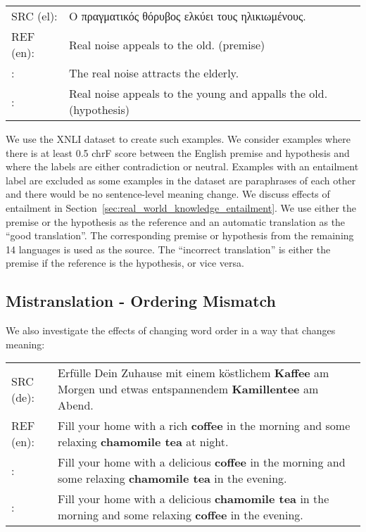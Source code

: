 \documentclass[11pt]{article}
\newcommand{\cmark}{\textcolor{darkpastelgreen}{\ding{51}}}\newcommand{\xmark}{\textcolor{darkpastelred}{\ding{55}}}
\begin{document}
\begin{small}
\vspace{0.5cm}
\setlength{\extrarowheight}{0.1cm}
\begin{tabularx}{0.95\columnwidth}{lX}
     SRC (el): &  \foreignlanguage{greek}{Ο πραγματικός θόρυβος ελκύει τους ηλικιωμένους}.\\
     REF (en): & Real noise appeals to the old. (premise) \\
     \cmark: & The real noise attracts the elderly. \\
     \xmark: &  Real noise appeals to the young and appalls the old. (hypothesis)\vspace{0.35cm}
\end{tabularx}
\end{small}

We use the XNLI dataset to create such examples. We consider examples where there is at least 0.5 chrF score between the English premise and hypothesis and where the labels are either contradiction or neutral. Examples with an entailment label are excluded as some examples in the dataset are paraphrases of each other and there would be no sentence-level meaning change. We discuss effects of entailment in Section~\ref{sec:real_world_knowledge_entailment}. We use either the premise or the hypothesis as the reference and an automatic translation as the ``good translation''. The corresponding premise or hypothesis from the remaining 14 languages is used as the source. The ``incorrect translation'' is either the premise if the reference is the hypothesis, or vice versa.


\subsection{Mistranslation - Ordering Mismatch}
We also investigate the effects of changing word order in a way that changes meaning:

\begin{small}
\vspace{0.5cm}
\setlength{\extrarowheight}{0.1cm}
\begin{tabularx}{0.95\columnwidth}{lX}
     SRC (de): & Erfülle Dein Zuhause mit einem köstlichem \textbf{Kaffee} am Morgen und etwas entspannendem \textbf{Kamillentee} am Abend. \\
     REF (en): & Fill your home with a rich \textbf{coffee} in the morning and some relaxing \textbf{chamomile tea} at night. \\
     \cmark: & Fill your home with a delicious \textbf{coffee} in the morning and some relaxing \textbf{chamomile tea} in the evening. \\
     \xmark: & Fill your home with a delicious \textbf{chamomile tea} in the morning and some relaxing \textbf{coffee} in the evening. \vspace{0.35cm}
\end{tabularx}
\end{small}
\end{document}
